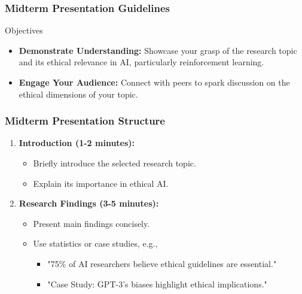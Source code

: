 \documentclass[aspectratio=169]{beamer}
\begin{document}
\begin{frame}[fragile]
    \frametitle{Midterm Presentation Guidelines}
    \begin{block}{Objectives}
        \begin{itemize}
            \item \textbf{Demonstrate Understanding:} Showcase your grasp of the research topic and its ethical relevance in AI, particularly reinforcement learning.
            \item \textbf{Engage Your Audience:} Connect with peers to spark discussion on the ethical dimensions of your topic.
        \end{itemize}
    \end{block}
\end{frame}

\begin{frame}[fragile]
    \frametitle{Midterm Presentation Structure}
    \begin{enumerate}
        \item \textbf{Introduction (1-2 minutes):}
            \begin{itemize}
                \item Briefly introduce the selected research topic.
                \item Explain its importance in ethical AI.
            \end{itemize}

        \item \textbf{Research Findings (3-5 minutes):}
            \begin{itemize}
                \item Present main findings concisely.
                \item Use statistics or case studies, e.g.,
                    \begin{itemize}
                        \item "75\% of AI researchers believe ethical guidelines are essential."
                        \item "Case Study: GPT-3's biases highlight ethical implications."
                    \end{itemize}
            \end{itemize}
    \end{enumerate}
\end{frame}
\end{document}
